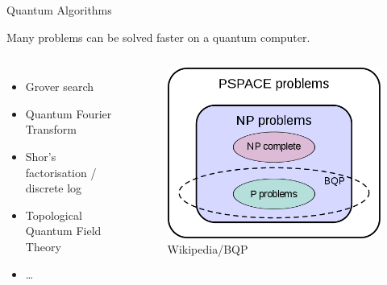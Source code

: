 \begin{frame}{Quantum Algorithms}
 
  Many problems can be solved faster on a quantum computer.
 
 
 \begin{columns}
  \begin{itemize}
   \item<2-> Grover search
   \item<3-> Quantum Fourier Transform
   \item<3-> Shor's factorisation / discrete log 
   \item<4-> Topological Quantum Field Theory
   \item<4-> \dots
  \end{itemize}
  

    \begin{figure}
     \centering
     \includegraphics[width=\linewidth]{gfx/BQP_complexity_class_diagram}
     \caption{\footnotesize Wikipedia/BQP}
    \end{figure}
 \end{columns}
 
 \begin{center}
 \end{center}

 
\end{frame}

